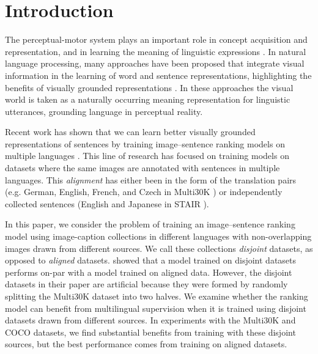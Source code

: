\section{Introduction}

The perceptual-motor system plays an important role 
in concept acquisition and representation, 
and in learning the meaning of linguistic expressions
\citep{pulvermuller2005brain}. In natural language 
processing, many approaches have been proposed that
integrate visual information in the learning of 
word and sentence representations, highlighting
the benefits of visually grounded representations
\citep{lazaridou2015combining,baroni2016grounding,kiela2017learning,elliott2017imagination}.
In these approaches the visual world is
taken as a naturally occurring meaning representation for 
linguistic utterances, grounding language in perceptual
reality.

 Recent work has shown that we can learn better 
 visually grounded representations of sentences by
 training image--sentence ranking models on 
 multiple languages \citep{gella2017image,kadar2018conll}. 
 This line of research has
 focused on training models on datasets where the same 
 images are annotated with sentences in multiple languages. 
 This \emph{alignment} has
 either been in the form of the translation pairs 
 (e.g. German, English, French, and Czech in
 Multi30K \citep{W16-3210}) or independently collected
 sentences (English and Japanese in STAIR
 \citep{Yoshikawa2017}). 
 
  In this paper, we consider the problem of training an image--sentence ranking model using image-caption collections 
 in different languages with non-overlapping images drawn from different sources. 
 We call these collections \emph{disjoint} datasets, as opposed to
 \emph{aligned} datasets.  \cite{kadar2018conll} showed that a
 model trained on disjoint datasets performs on-par with a model
 trained on aligned data. However, the disjoint datasets in their paper are artificial because they were formed by randomly splitting the Multi30K dataset into two halves. We examine whether the ranking model
 can benefit from multilingual supervision when it is
 trained using disjoint datasets drawn from different
 sources. In experiments with the Multi30K and COCO datasets,
 we find substantial benefits from training with these disjoint sources, but the best performance 
 comes from training on aligned datasets.
 
